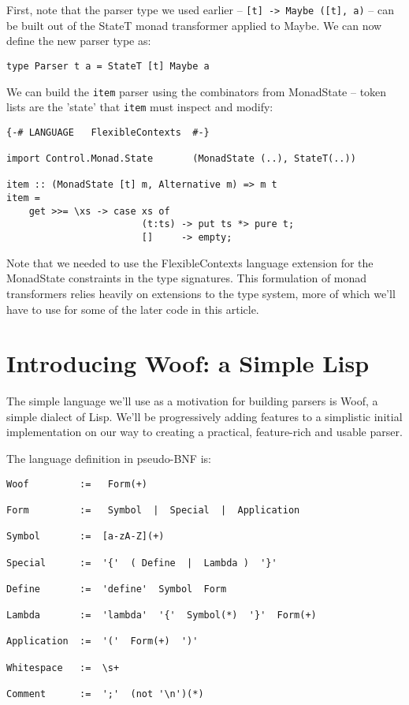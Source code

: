 \documentclass{tmr}
\begin{document}
First, note that the parser type we used earlier -- \verb+[t] -> Maybe ([t], a)+
-- can be built out of the StateT monad transformer applied to Maybe.  We can 
now define the new parser type as:
\begin{verbatim}
type Parser t a = StateT [t] Maybe a
\end{verbatim}

We can build the \verb+item+ parser using the combinators from MonadState --
token lists are the 'state' that \verb+item+ must inspect and modify:
\begin{verbatim}
{-# LANGUAGE   FlexibleContexts  #-}

import Control.Monad.State       (MonadState (..), StateT(..))

item :: (MonadState [t] m, Alternative m) => m t
item =
    get >>= \xs -> case xs of
                        (t:ts) -> put ts *> pure t;
                        []     -> empty;
\end{verbatim}
Note that we needed to use the FlexibleContexts language extension for the 
MonadState constraints in the type signatures.  This formulation of monad
transformers relies heavily on extensions to the type system, more of which 
we'll have to use for some of the later code in this article.




\section{Introducing Woof:  a Simple Lisp}
The simple language we'll use as a motivation for building parsers is 
Woof, a simple dialect of Lisp.  We'll be 
progressively adding features to a simplistic initial implementation
on our way to creating a practical, feature-rich and usable parser.

The language definition in pseudo-BNF \cite{bnf} is:

\begin{verbatim}
Woof         :=   Form(+)

Form         :=   Symbol  |  Special  |  Application

Symbol       :=  [a-zA-Z](+)

Special      :=  '{'  ( Define  |  Lambda )  '}'

Define       :=  'define'  Symbol  Form

Lambda       :=  'lambda'  '{'  Symbol(*)  '}'  Form(+)

Application  :=  '('  Form(+)  ')'

Whitespace   :=  \s+

Comment      :=  ';'  (not '\n')(*)
\end{verbatim}
\end{document}
